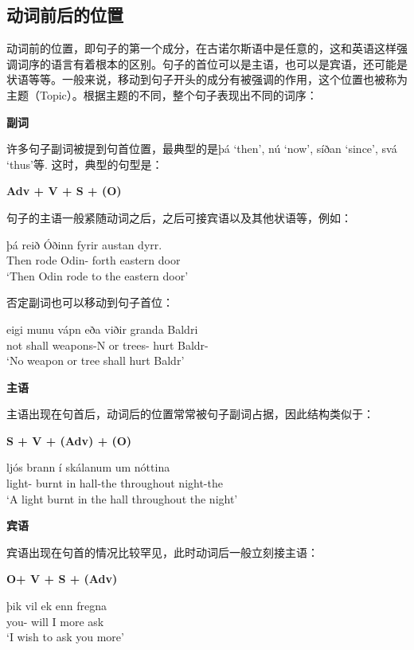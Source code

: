 \subsection{动词前后的位置}
动词前的位置，即句子的第一个成分，在古诺尔斯语中是任意的，这和英语这样强调词序的语言有着根本的区别。句子的首位可以是主语，也可以是宾语，还可能是状语等等。一般来说，移动到句子开头的成分有被强调的作用，这个位置也被称为主题（Topic）。根据主题的不同，整个句子表现出不同的词序：

\textbf{副词}

许多句子副词被提到句首位置，最典型的是þá `then’, nú `now’, síðan `since’, svá `thus’等. 这时，典型的句型是：
 \begin{center}
    \textbf{Adv + V + S + (O)}
\end{center}

句子的主语一般紧随动词之后，之后可接宾语以及其他状语等，例如：
\begin{exe}
    \ex \gll
    þá	reið	Óðinn	fyrir	austan	dyrr.\\
Then	rode	Odin-{\nom}	forth	eastern	door\\
\trans `Then Odin rode to the eastern door’
\end{exe}

否定副词也可以移动到句子首位：
\begin{exe}
    \ex \gll 
    eigi	munu	vápn	eða	viðir	granda	Baldri\\
not	shall	weapons-N	or	trees-{\nom}	hurt	Baldr-{\dat}\\
\trans `No weapon or tree shall hurt Baldr’
\end{exe}

\textbf{主语}

主语出现在句首后，动词后的位置常常被句子副词占据，因此结构类似于：
\begin{center}
    \textbf{S + V + (Adv) + (O)}
\end{center}
\begin{exe}
    \ex \gll
    ljós	brann	í	skálanum	um	nóttina\\
light-{\nom}	burnt	in	hall-the	throughout	night-the\\
\trans `A light burnt in the hall throughout the night’
\end{exe}

\textbf{宾语}

宾语出现在句首的情况比较罕见，此时动词后一般立刻接主语：
\begin{center}
    \textbf{O+ V + S + (Adv)}
\end{center}
\begin{exe}
    \ex \gll
    þik	vil	ek	enn	fregna\\
you-{\acc}	will	I	more	ask\\
\trans `I wish to ask you more’
\end{exe}

